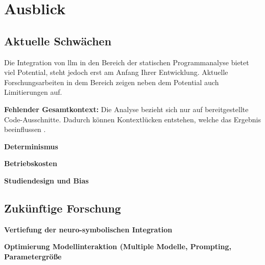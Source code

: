 \section{Ausblick}

\subsection{Aktuelle Schwächen}

Die Integration von \ac{llm} in den Bereich der statischen Programmanalyse bietet viel Potential, steht jedoch erst am Anfang Ihrer Entwicklung. Aktuelle Forschungsarbeiten in dem Bereich zeigen neben dem Potential auch Limitierungen auf.

\textbf{Fehlender Gesamtkontext:} Die Analyse bezieht sich nur auf bereitgestellte Code-Ausschnitte. Dadurch können Kontextlücken entstehen, welche das Ergebnis beeinflussen \cite{liIRISLLMAssistedStatic2024}.

\textbf{Determinismus} 

\textbf{Betriebskosten}

\textbf{Studiendesign und Bias}

\subsection{Zukünftige Forschung}

\textbf{Vertiefung der neuro-symbolischen Integration}

\textbf{Optimierung Modellinteraktion (Multiple Modelle, Prompting, Parametergröße}
